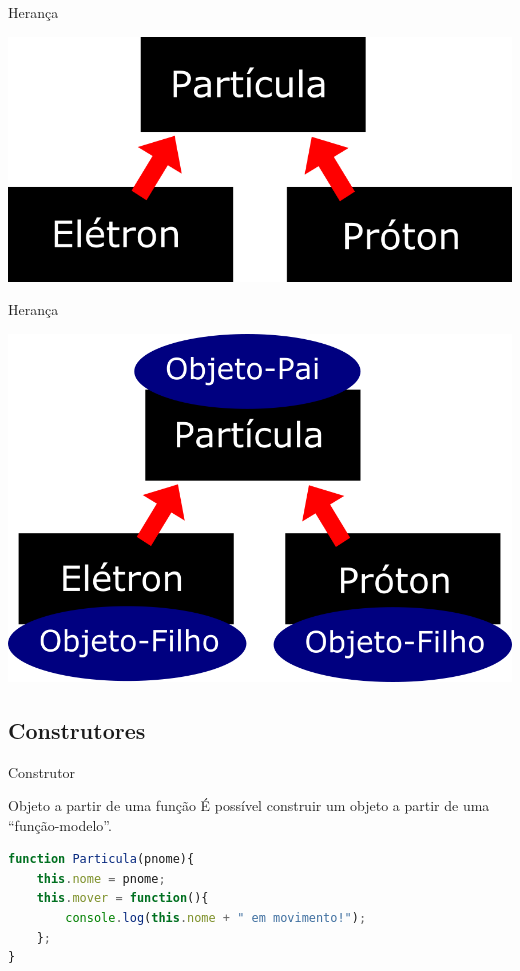 \documentclass[xcolor=dvipsnames,table]{beamer}
\begin{document}
\begin{frame}{Herança}
	\begin{center}
		\includegraphics[scale=0.3]{images/heranca02.png}
	\end{center}
\end{frame}

\begin{frame}{Herança}
	\begin{center}
		\includegraphics[scale=0.3]{images/heranca03.png}
	\end{center}
\end{frame}

\subsection{Construtores}
\begin{frame}[fragile]{Construtor}
	\begin{block}{Objeto a partir de uma função}
		É possível construir um objeto a partir de uma ``função-modelo''.
		\begin{lstlisting}[language=JavaScript]
function Particula(pnome){
	this.nome = pnome;
	this.mover = function(){
		console.log(this.nome + " em movimento!");
	};
}
\end{lstlisting}	
	\end{block}
\end{frame}
\end{document}
